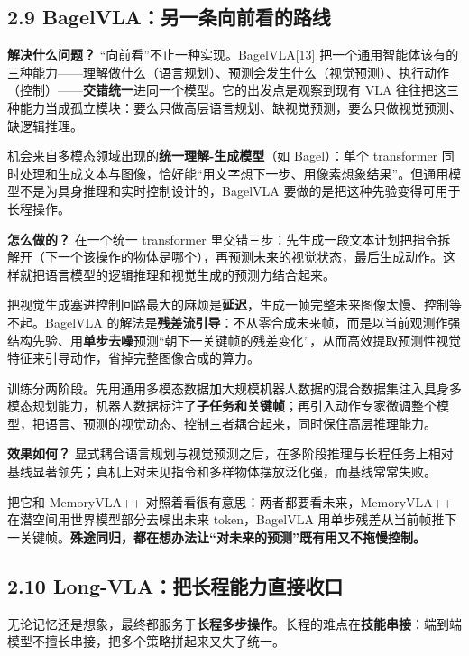 \documentclass[
  chinese,
]{ctexart}
\begin{document}
\subsection{2.9
BagelVLA：另一条向前看的路线}\label{bagelvlaux53e6ux4e00ux6761ux5411ux524dux770bux7684ux8defux7ebf}

\textbf{解决什么问题？} ``向前看''不止一种实现。BagelVLA{[}13{]}
把一个通用智能体该有的三种能力------理解做什么（语言规划）、预测会发生什么（视觉预测）、执行动作（控制）------\textbf{交错统一}进同一个模型。它的出发点是观察到现有
VLA
往往把这三种能力当成孤立模块：要么只做高层语言规划、缺视觉预测，要么只做视觉预测、缺逻辑推理。

机会来自多模态领域出现的\textbf{统一理解-生成模型}（如 Bagel）：单个
transformer
同时处理和生成文本与图像，恰好能``用文字想下一步、用像素想象结果''。但通用模型不是为具身推理和实时控制设计的，BagelVLA
要做的是把这种先验变得可用于长程操作。

\textbf{怎么做的？} 在一个统一 transformer
里交错三步：先生成一段文本计划把指令拆解开（下一个该操作的物体是哪个），再预测未来的视觉状态，最后生成动作。这样就把语言模型的逻辑推理和视觉生成的预测力结合起来。

把视觉生成塞进控制回路最大的麻烦是\textbf{延迟}，生成一帧完整未来图像太慢、控制等不起。BagelVLA
的解法是\textbf{残差流引导}：不从零合成未来帧，而是以当前观测作强结构先验、用\textbf{单步去噪}预测``朝下一关键帧的残差变化''，从而高效提取预测性视觉特征来引导动作，省掉完整图像合成的算力。

训练分两阶段。先用通用多模态数据加大规模机器人数据的混合数据集注入具身多模态规划能力，机器人数据标注了\textbf{子任务和关键帧}；再引入动作专家微调整个模型，把语言、预测的视觉动态、控制三者耦合起来，同时保住高层推理能力。

\textbf{效果如何？}
显式耦合语言规划与视觉预测之后，在多阶段推理与长程任务上相对基线显著领先；真机上对未见指令和多样物体摆放泛化强，而基线常常失败。

把它和 MemoryVLA++ 对照着看很有意思：两者都要看未来，MemoryVLA++
在潜空间用世界模型部分去噪出未来 token，BagelVLA
用单步残差从当前帧推下一关键帧。\textbf{殊途同归，都在想办法让``对未来的预测''既有用又不拖慢控制。}

\subsection{2.10
Long-VLA：把长程能力直接收口}\label{long-vlaux628aux957fux7a0bux80fdux529bux76f4ux63a5ux6536ux53e3}

无论记忆还是想象，最终都服务于\textbf{长程多步操作}。长程的难点在\textbf{技能串接}：端到端模型不擅长串接，把多个策略拼起来又失了统一。
\end{document}
